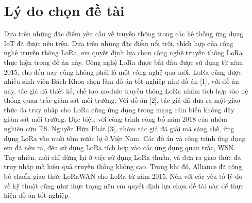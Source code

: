 \section{Lý do chọn đề tài}
Dựa trên những đặc điểm yêu cầu về truyền thông trong các hệ thống ứng dụng IoT đã được nêu trên. Dựa trên những đặc điểm nổi trội, thích hợp của công nghệ truyền thông LoRa, em quyết định lựa chọn công nghệ truyền thông LoRa thực hiện trong đồ án này. Công nghệ LoRa được bắt đầu được sử dụng từ năm 2015, cho đến nay cũng không phải là một công nghệ quá mới. LoRa cũng được nhiều sinh viên Bách Khoa chọn làm đồ án tốt nghiệp như đồ án [1], với đồ án này, tác giả đã thiết kế, chế tạo module truyền thông LoRa nhằm tích hợp vào hệ thống quan trắc giám sát môi trường. Với đồ án [2], tác giả đã đưa ra một giao thức đa truy nhập cho LoRa cũng ứng dụng trong mạng cảm biến không dây giám sát môi trường. Đặc biệt, với công trình công bố năm 2018 của nhóm nghiên cứu TS. Nguyễn Hữu Phát [3], nhóm tác giả đã giải mã sáng chế, ứng dụng LoRa vào nuôi tôm nước lợ ở Việt Nam. Các đồ án và công trình ứng dụng em đã nêu ra, đều sử dụng LoRa tích hợp vào các ứng dụng quan trắc, WSN. Tuy nhiên, mới chỉ dừng lại ở việc sử dụng LoRa thuần, và đưa ra giao thức đa truy nhập mà hiệu quả truyền thông không cao. Trong khi đó, Alliance đã công bố chuẩn giao thức LoRaWAN cho LoRa từ năm 2015. Nên với các yếu tố lý do về kỹ thuật cũng như thực trạng nên em quyết định lựa chọn đề tài này để thực hiện đồ án tốt nghiệp.


